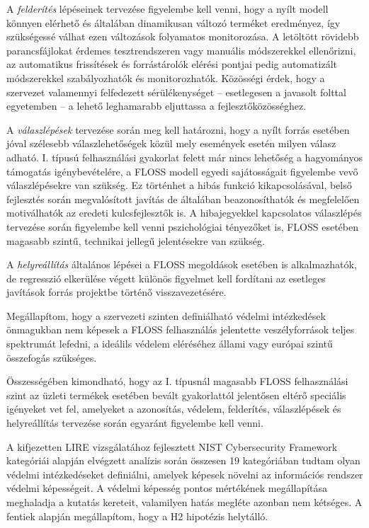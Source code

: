 \documentclass[12pt,magyar,a4paper,oneside]{scrreprt}
\begin{document}
A \emph{felderítés} lépéseinek tervezése figyelembe kell venni, hogy a
nyílt modell könnyen elérhető és általában dinamikusan változó terméket
eredményez, így szükségessé válhat ezen változások folyamatos
monitorozása. A letöltött rövidebb parancsfájlokat érdemes
tesztrendszeren vagy manuális módszerekkel ellenőrizni, az automatikus
frissítések és forrástárolók elérési pontjai pedig automatizált
módszerekkel szabályozhatók és monitorozhatók. Közösségi érdek, hogy a
szervezet valamennyi felfedezett sérülékenységet -- esetlegesen a
javasolt folttal egyetemben -- a lehető leghamarabb eljuttassa a
fejlesztőközösséghez.

A \emph{válaszlépések} tervezése során meg kell határozni, hogy a nyílt
forrás esetében jóval szélesebb válaszlehetőségek közül mely események
esetén milyen válasz adható. I. típusú felhasználási gyakorlat felett
már nincs lehetőség a hagyományos támogatás igénybevételére, a FLOSS
modell egyedi sajátosságait figyelembe vevő válaszlépésekre van szükség.
Ez történhet a hibás funkció kikapcsolásával, belső fejlesztés során
megvalósított javítás de általában beazonosíthatók és megfelelően
motiválhatók az eredeti kulcsfejlesztők is. A hibajegyekkel kapcsolatos
válaszlépés tervezése során figyelembe kell venni pszichológiai
tényezőket is, FLOSS esetében magasabb szintű, technikai jellegű
jelentésekre van szükség.

A \emph{helyreállítás} általános lépései a FLOSS megoldások esetében is
alkalmazhatók, de regresszió elkerülése végett különös figyelmet kell
fordítani az esetleges javítások forrás projektbe történő
visszavezetésére.

Megállapítom, hogy a szervezeti szinten definiálható védelmi
intézkedések önmagukban nem képesek a FLOSS felhasználás jelentette
veszélyforrások teljes spektrumát lefedni, a ideálils védelem eléréséhez
állami vagy európai szintű összefogás szükséges.

Összességében kimondható, hogy az I. típusnál magasabb FLOSS
felhasználási szint az üzleti termékek esetében bevált gyakorlattól
jelentősen eltérő speciális igényeket vet fel, amelyeket a azonosítás,
védelem, felderítés, válaszlépések és helyreállítás tervezése során
egyaránt figyelembe kell venni.

A kifjezetten LIRE vizsgálatához fejlesztett NIST Cybersecurity
Framework kategóriái alapján elvégzett analízis során összesen 19
kategóriában tudtam olyan védelmi intézkedéseket definiálni, amelyek
képesek növelni az információs rendszer védelmi képességeit. A védelmi
képesség pontos mértékének megállapítása meghaladja a kutatás kereteit,
valamilyen hatás megléte azonban nem kétséges. A fentiek alapján
megállapítom, hogy a H2 hipotézis helytálló.
\end{document}
